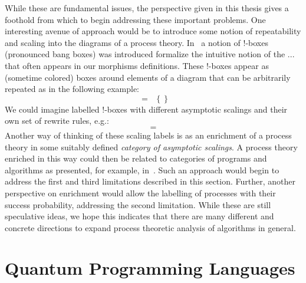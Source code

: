 While these are fundamental issues, the perspective given in this thesis gives a foothold from which to begin addressing these important problems. One interesting avenue of approach would be to introduce some notion of repeatability and scaling into the diagrams of a process theory. In~\cite{kissinger2012pictures,kissinger2015tensors} a notion of !-boxes (pronounced bang boxes) was introduced formalize the intuitive notion of the $...$ that often appears in our morphisms definitions. These !-boxes appear as (sometime colored) boxes around elements of a diagram that can be arbitrarily repeated as in the following example:
\begin{equation}

\;=\;\;
\left\{  \right\}
\end{equation}
We could imagine labelled !-boxes with different asymptotic scalings and their own set of rewrite rules, e.g.:
\begin{equation}

\;=\;

\end{equation}
Another way of thinking of these scaling labels is as an enrichment of a process theory in some suitably defined \emph{category of asymptotic scalings}. A process theory enriched in this way could then be related to categories of programs and algorithms as presented, for example, in~\cite{yanofsky2010towards}. Such an approach would begin to address the first and third limitations described in this section. Further, another perspective on enrichment would allow the labelling of processes with their success probability, addressing the second limitation. While these are still speculative ideas, we hope this indicates that there are many different and concrete directions to expand process theoretic analysis of algorithms in general.

\section{Quantum Programming Languages}

